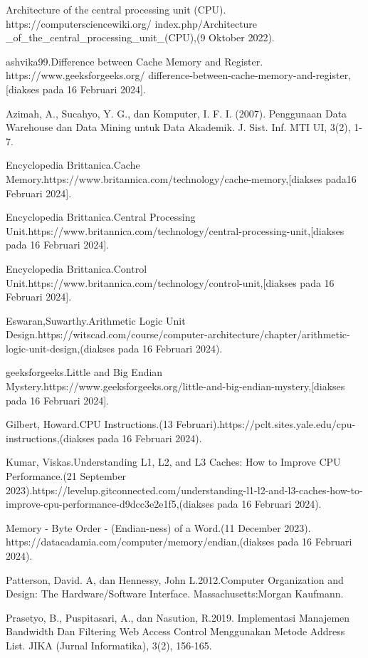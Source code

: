 Architecture of the central processing unit (CPU). https://computersciencewiki.org/
\linebreak
index.php/Architecture
\_of\_the\_central\_processing\_unit\_(CPU),(9 Oktober 2022).

ashvika99.Difference between Cache Memory and Register.
https://www.geeksforgeeks.org/
difference-between-cache-memory-and-register,[diakses pada 16 Februari 2024].

Azimah, A., Sucahyo, Y. G., dan Komputer, I. F. I. (2007). Penggunaan Data Warehouse dan Data Mining untuk Data Akademik. J. Sist. Inf. MTI UI, 3(2), 1-7.

Encyclopedia Brittanica.Cache Memory.https://www.britannica.com/technology/cache-memory,[diakses pada16 Februari 2024].

Encyclopedia Brittanica.Central Processing Unit.https://www.britannica.com/technology/central-processing-unit,[diakses pada 16 Februari 2024].

Encyclopedia Brittanica.Control Unit.https://www.britannica.com/technology/control-unit,[diakses pada 16 Februari 2024].

Eswaran,Suwarthy.Arithmetic Logic Unit Design.https://witscad.com/course/computer-architecture/chapter/arithmetic-logic-unit-design,(diakses pada 16 Februari 2024).

geeksforgeeks.Little and Big Endian Mystery.https://www.geeksforgeeks.org/little-and-big-endian-mystery,[diakses pada 16 Februari 2024].

Gilbert, Howard.CPU Instructions.(13 Februari).https://pclt.sites.yale.edu/cpu-instructions,(diakses pada 16 Februari 2024).

Kumar, Viskas.Understanding L1, L2, and L3 Caches: How to Improve CPU Performance.(21 September 2023).https://levelup.gitconnected.com/understanding-l1-l2-and-l3-caches-how-to-improve-cpu-performance-d9dcc3e2e1f5,(diakses pada 16 Februari 2024).

Memory - Byte Order - (Endian-ness) of a Word.(11 December 2023).
\linebreak
https://datacadamia.com/computer/memory/endian,(diakses pada 16 Februari 2024).

Patterson, David. A, dan Hennessy, John L.2012.Computer Organization and Design: The Hardware/Software Interface. Massachusetts:Morgan Kaufmann.

Prasetyo, B., Puspitasari, A., dan Nasution, R.2019. Implementasi Manajemen Bandwidth Dan Filtering Web Access Control Menggunakan Metode Address List. JIKA (Jurnal Informatika), 3(2), 156-165.

